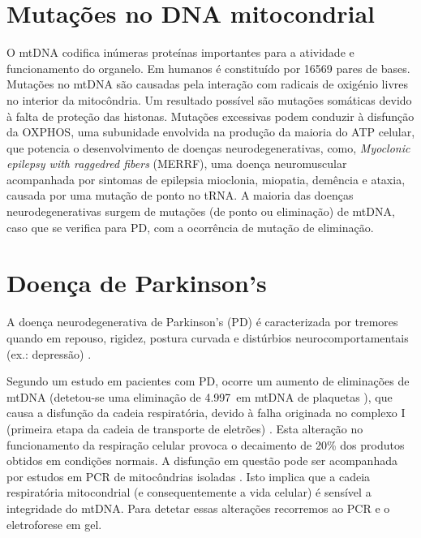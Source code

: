 \documentclass{article}
\begin{document}
    \section{Mutações no DNA mitocondrial}
    O mtDNA codifica inúmeras proteínas importantes para a atividade e funcionamento do organelo. Em humanos é constituído por 16569 pares de bases. Mutações no mtDNA são causadas pela interação com radicais de oxigénio livres no interior da mitocôndria. Um resultado possível são mutações somáticas devido à falta de proteção das histonas. Mutações excessivas podem conduzir à disfunção da OXPHOS, uma subunidade envolvida na produção da maioria do ATP celular, que potencia o desenvolvimento de doenças neurodegenerativas, como, \textit{Myoclonic epilepsy with raggedred fibers} (MERRF), uma doença neuromuscular acompanhada por sintomas de epilepsia mioclonia, miopatia, demência e ataxia, causada por uma mutação de ponto no tRNA. \cite{Velez-Bartolomei:1993aa}\cite{Zeviani:2022aa} A maioria das doenças neurodegenerativas surgem de mutações (de ponto ou eliminação) de mtDNA, caso que se verifica para PD, com a ocorrência de mutação de eliminação.
    \section{Doença de Parkinson's}
    A doença neurodegenerativa de Parkinson's (PD) é caracterizada por tremores quando em repouso, rigidez, postura curvada e distúrbios neurocomportamentais (ex.: depressão) \cite{Sofronova:2016aa}.\par
    Segundo um estudo em pacientes com PD, ocorre um aumento de eliminações de mtDNA (detetou-se uma eliminação de 4.997\,\unit{} em mtDNA de plaquetas \cite{Sandy:1993aa}), que causa a disfunção da cadeia respiratória, devido à falha originada no complexo I (primeira etapa da cadeia de transporte de eletrões) \cite{Swerdlow:1996aa}. Esta alteração no funcionamento da respiração celular provoca o decaimento de 20\% dos produtos obtidos em condições normais. A disfunção em questão pode ser acompanhada por estudos em PCR de mitocôndrias isoladas \cite{Diaz:2009aa}. Isto implica que a cadeia respiratória mitocondrial (e consequentemente a vida celular) é sensível a integridade do mtDNA. Para detetar essas alterações recorremos ao PCR e o eletroforese em gel.
\end{document}
